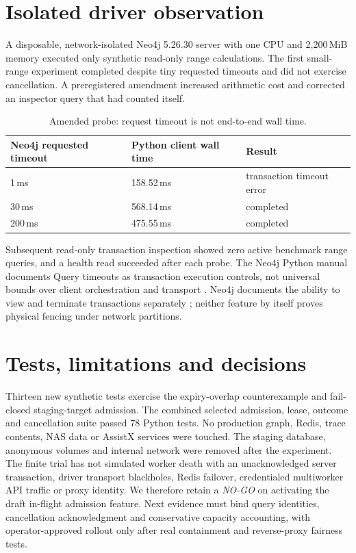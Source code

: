 \documentclass[11pt]{article}
\begin{document}
\section{Isolated driver observation}
A disposable, network-isolated Neo4j 5.26.30 server with one CPU and 2{,}200\,MiB memory executed only synthetic read-only range calculations. The first small-range experiment completed despite tiny requested timeouts and did not exercise cancellation. A preregistered amendment increased arithmetic cost and corrected an inspector query that had counted itself.

\begin{table}[h]\centering
\caption{Amended probe: request timeout is not end-to-end wall time.}
\begin{tabular}{lll}\toprule
Neo4j requested timeout & Python client wall time & Result\\\midrule
1\,ms & 158.52\,ms & transaction timeout error\\
30\,ms & 568.14\,ms & completed\\
200\,ms & 475.55\,ms & completed\\\bottomrule
\end{tabular}
\end{table}
Subsequent read-only transaction inspection showed zero active benchmark range queries, and a health read succeeded after each probe. The Neo4j Python manual documents Query timeouts as transaction execution controls, not universal bounds over client orchestration and transport \cite{neoquery}. Neo4j documents the ability to view and terminate transactions separately \cite{neoops}; neither feature by itself proves physical fencing under network partitions.
\section{Tests, limitations and decisions}
Thirteen new synthetic tests exercise the expiry-overlap counterexample and fail-closed staging-target admission. The combined selected admission, lease, outcome and cancellation suite passed 78 Python tests. No production graph, Redis, trace contents, NAS data or AssistX services were touched. The staging database, anonymous volumes and internal network were removed after the experiment. The finite trial has not simulated worker death with an unacknowledged server transaction, driver transport blackholes, Redis failover, credentialed multiworker API traffic or proxy identity. We therefore retain a \emph{NO-GO} on activating the draft in-flight admission feature. Next evidence must bind query identities, cancellation acknowledgment and conservative capacity accounting, with operator-approved rollout only after real containment and reverse-proxy fairness tests.
\end{document}
